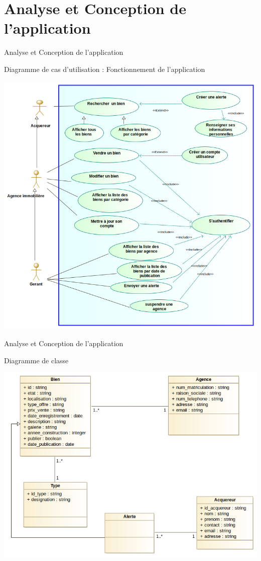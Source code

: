 \documentclass[5pt]{beamer}
\begin{document}
{\section{ Analyse et Conception de l'application }
\begin{frame}[fragile]{Analyse et Conception de l'application}
\begin{block}{Diagramme de cas d'utilisation : Fonctionnement de l'application}

\begin{center}
\includegraphics[scale=0.25]{diagramCas.png}
\end{center}
	\end{block}
\end{frame}
\begin{frame}[fragile]{Analyse et Conception de l'application}
\begin{block}{Diagramme de classe}

\begin{center}
\includegraphics[scale=0.25]{Diagramme_class.png}
\end{center}
	\end{block}
\end{frame}


}
\end{document}
